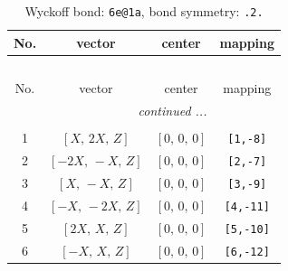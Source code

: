 \documentclass[fleqn,8pt]{jsarticle}
\begin{document}
\renewcommand{\arraystretch}{1.2}
\begin{longtable}{cccc}
\caption{Wyckoff bond: {\tt 6e@1a}, bond symmetry: {\tt .2.}}
 \\
 \hline \hline
No. & vector & center & mapping \\ \hline \endfirsthead

\multicolumn{3}{l}{\tablename\ \thetable{}} \\
 \hline \hline
No. & vector & center & mapping \\ \hline \endhead

 \hline \hline
\multicolumn{3}{r}{\footnotesize\it continued ...} \\ \endfoot

 \hline \hline
\multicolumn{3}{r}{} \\ \endlastfoot

1 & $\left[ X,\, 2 X,\, Z \right]$ & $\left[ 0,\, 0,\, 0 \right]$ & {\tt [1,-8]} \\ \hline
2 & $\left[ - 2 X,\, - X,\, Z \right]$ & $\left[ 0,\, 0,\, 0 \right]$ & {\tt [2,-7]} \\ \hline
3 & $\left[ X,\, - X,\, Z \right]$ & $\left[ 0,\, 0,\, 0 \right]$ & {\tt [3,-9]} \\ \hline
4 & $\left[ - X,\, - 2 X,\, Z \right]$ & $\left[ 0,\, 0,\, 0 \right]$ & {\tt [4,-11]} \\ \hline
5 & $\left[ 2 X,\, X,\, Z \right]$ & $\left[ 0,\, 0,\, 0 \right]$ & {\tt [5,-10]} \\ \hline
6 & $\left[ - X,\, X,\, Z \right]$ & $\left[ 0,\, 0,\, 0 \right]$ & {\tt [6,-12]} \\
\end{longtable}
\renewcommand{\arraystretch}{1.2}
\end{document}
